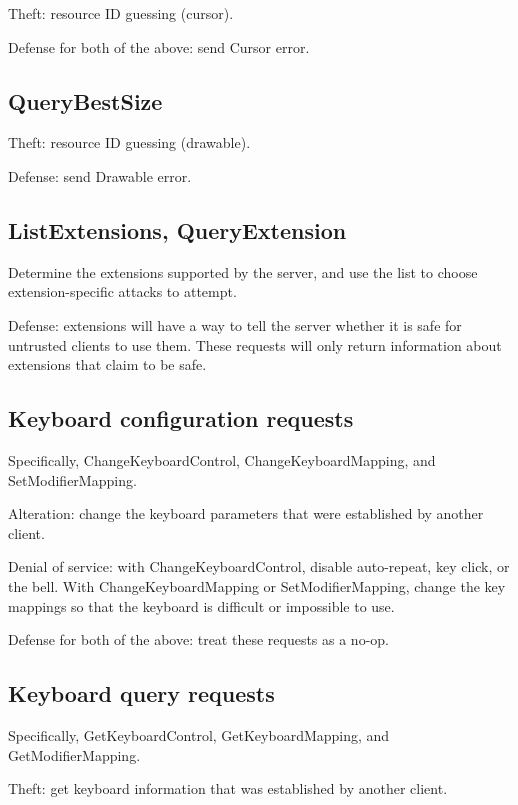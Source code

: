 Theft: resource ID guessing (cursor).

Defense for both of the above: send Cursor error.



\subsection{QueryBestSize}

Theft: resource ID guessing (drawable).

Defense: send Drawable error.



\subsection{ListExtensions, QueryExtension}

Determine the extensions supported by the server, and use the list to
choose extension-specific attacks to attempt.

Defense: extensions will have a way to tell the server whether it is
safe for untrusted clients to use them.  These requests will only
return information about extensions that claim to be safe.



\subsection{Keyboard configuration requests}

Specifically, ChangeKeyboardControl, ChangeKeyboardMapping,
and SetModifierMapping.

Alteration: change the keyboard parameters that were established by
another client.

Denial of service: with ChangeKeyboardControl, disable auto-repeat,
key click, or the bell.  With ChangeKeyboardMapping or
SetModifierMapping, change the key mappings so that the keyboard is
difficult or impossible to use.

Defense for both of the above: treat these requests as a no-op.



\subsection{Keyboard query requests}

Specifically, GetKeyboardControl, GetKeyboardMapping, and
GetModifierMapping.

Theft: get keyboard information that was established by another
client.


